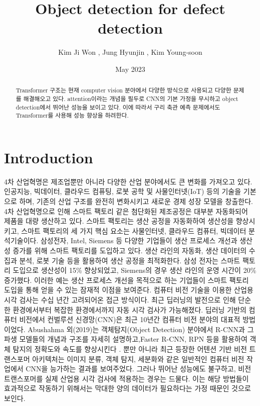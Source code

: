 \documentclass[10pt,twocolumn,letterpaper]{article}
\title{Object detection for defect detection}
\author{Kim Ji Won , Jung Hyunjin , Kim Young-soon}
\date{May 2023}
\begin{document}
\maketitle
\begin{center}
\begin{abstract}
  Transformer 구조는 현재 computer vision 분야에서 다양한 방식으로 사용되고 다양한 문제를 해결해오고 있다.
  attention이라는 개념을 필두로 CNN의 기본 가정을 무시하고 object detection에서 뛰어난 성능을 보이고 있다.
  이에 따라서 구리 축관 예측 문제에서도 Transformer를 사용해 성능 향상을 하려한다.
\end{abstract}
\end{center}

\section{Introduction}
4차 산업혁명은 제조업뿐만 아니라 다양한 산업 분야에서도 큰 변화를 가져오고 있다. 인공지능, 빅데이터, 클라우드 컴퓨팅, 로봇 공학 및 사물인터넷(IoT) 등의 기술을 기본으로 하며, 기존의 산업 구조를 완전히 변화시키고 새로운 경제 성장 모델을 창출한다. 4차 산업혁명으로 인해 스마트 팩토리 같은 첨단화된 제조공정은 대부분 자동화되어 제품을 대량 생산하고 있다. 
스마트 팩토리는 생산 공정을 자동화하여 생산성을 향상시키고, 스마트 팩토리의 세 가지 핵심 요소는 사물인터넷, 클라우드 컴퓨터, 빅데이터 분석기술이다.  삼성전자, Intel, Siemens 등 다양한 기업들이 생산 프로세스 개선과 생산성 증가를 위해 스마트 팩토리를 도입하고 있다. 생산 라인의 자동화, 생산 데이터의 수집과 분석, 로봇 기술 등을 활용하여 생산 공정을 최적화한다. 삼성 전자는 스마트 팩토리 도입으로 생산성이 15\% 향상되었고, Siemens의 경우 생산 라인의 운영 시간이 20\% 증가했다. 이러한 예는 생산 프로세스 개선을 목적으로 하는 기업들이 스마트 팩토리 도입을 통해 얻을 수 있는 잠재적 이점을 보여준다. 
컴퓨터 비전 기술을 이용한 산업용 시각 검사는 수십 년간 고려되어온 접근 방식이다. 최근 딥러닝의 발전으로 인해 단순한 환경에서부터 복잡한 환경에서까지 자동 시각 검사가 가능해졌다. 딥러닝 기반의 컴퓨터 비전에서 컨벌루션 신경망(CNN)은 최근 10년간 컴퓨터 비전 분야의 대표적 방법이었다. Abushahma 외(2019)는 객체탐지(Object Detection) 분야에서 R-CNN과 그 파생 모델들의 개념과 구조를 자세히 설명하고,Faster R-CNN, RPN 등을 활용하여 객체 탐지의 정확도와 속도를 향상시킨다 . 
뿐만 아니라 최근 등장한 어텐션 기반 비전 트랜스포머 아키텍처는 이미지 분류, 객체 탐지, 세분화와 같은 일반적인 컴퓨터 비전 작업에서 CNN을 능가하는 결과를 보여주었다. 그러나 뛰어난 성능에도 불구하고, 비전 트랜스포머를 실제 산업용 시각 검사에 적용하는 경우는 드물다. 이는 해당 방법들이 효과적으로 작동하기 위해서는 막대한 양의 데이터가 필요하다는 가정 때문인 것으로 보인다.
\end{document}
